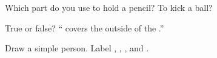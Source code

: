 \begin{exercise}[$\star$]\label{exo:g1:my-body:3}
Which part do you use to hold a pencil? To kick a ball?
\end{exercise}

\begin{exercise}[$\star$]\label{exo:g1:my-body:4}
True or false? `` covers the outside of the .''
\end{exercise}

\begin{exercise}[$\star\star$]\label{exo:g1:my-body:5}
Draw a simple person. Label , , ,  and .
\end{exercise}

